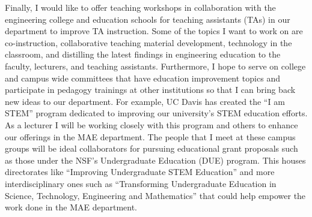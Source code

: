 \documentclass{article}
\begin{document}
Finally, I would like to offer teaching workshops in collaboration with the
engineering college and education schools for teaching assistants (TAs) in our
department to improve TA instruction. Some of the topics I want to work on are
co-instruction, collaborative teaching material development, technology in the
classroom, and distilling the latest findings in engineering education to the
faculty, lecturers, and teaching assistants. Furthermore, I hope to serve on
college and campus wide committees that have education improvement topics and
participate in pedagogy trainings at other institutions so that I can bring
back new ideas to our department. For example, UC Davis has created the ``I am
STEM'' program dedicated to improving our university's STEM education efforts.
As a lecturer I will be working closely with this program and others to enhance
our offerings in the MAE department. The people that I meet at these campus
groups will be ideal collaborators for pursuing educational grant proposals
such as those under the NSF's Undergraduate Education (DUE) program. This
houses directorates like ``Improving Undergraduate STEM Education'' and more
interdisciplinary ones such as ``Transforming Undergraduate Education in
Science, Technology, Engineering and Mathematics'' that could help empower the
work done in the MAE department.
\end{document}
